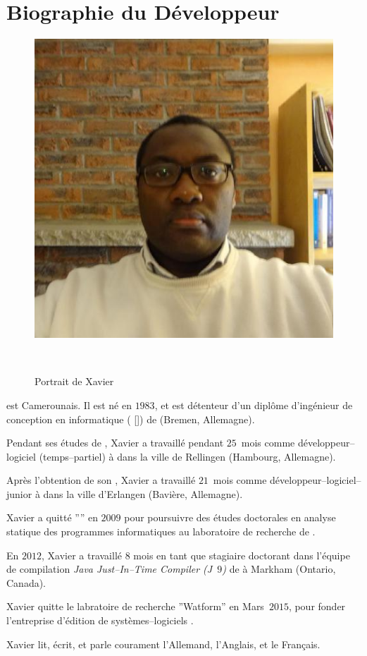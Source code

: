 \vspace{-1.1em}
\section{Biographie du D\'eveloppeur}\label{chap:biography}
\vspace{-0.9em}
\begin{figure}[!htpb]
\centering
\includegraphics[scale=0.35]{../images/XavierNOUNDOU-2}
\caption{Portrait de Xavier}~\label{fig:xaviernoumbis}
\end{figure}

 est Camerounais.
Il est n\'e en $1983$, et est d\'etenteur d'un
dipl\^ome d'ing\'enieur de conception en informatique
(\emph{\diplominformatiker} [\diplinf]) de 
(Bremen, Allemagne).

Pendant ses \'etudes de \diplinf,
Xavier a travaill\'e pendant $25$~mois comme
d\'eveloppeur--logiciel (temps--partiel) \`a
\company{\bergmann} dans la ville de Rellingen
(Hambourg, Allemagne).

Apr\`es l'obtention de son \diplinf, Xavier a travaill\'e
$21$~mois comme d\'eveloppeur--logiciel--junior \`a
\company{\siemens} dans la ville d'Erlangen (Bavi\`ere, Allemagne).

Xavier a quitt\'e ''\siemens'' en $2009$ pour poursuivre
des \'etudes doctorales en analyse statique des programmes
informatiques au laboratoire de recherche 
de .

En $2012$, Xavier a travaill\'e $8$ mois en tant
que stagiaire doctorant dans l'\'equipe de compilation 
\emph{Java Just--In--Time Compiler (J~$9$)} de
 \`a Markham (Ontario, Canada).

Xavier quitte le labratoire de recherche ''Watform''
en Mars~$2015$, pour fonder l'entreprise d'\'edition
de syst\`emes--logiciels \textbf{\yerenlabs}.

Xavier lit, \'ecrit, et parle courament l'Allemand,
l'Anglais, et le Fran\c{c}ais.
